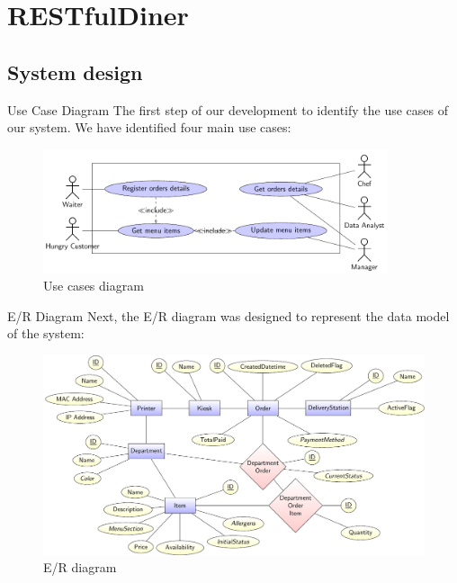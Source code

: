 

\section[RESTfulDiner]{RESTfulDiner}

\subsection[System design]{System design}

\begin{frame}{Use Case Diagram}
	The first step of our development to identify the use cases of our system.
	We have identified four main use cases:

	\begin{figure}[h!]
		\centering
		\includegraphics[width=0.9\textwidth,height=0.55\textheight,keepaspectratio]{images/usecases}
		\caption{Use cases diagram}
		\label{fig:usecases}
	\end{figure}

\end{frame}

\begin{frame}{E/R Diagram}
	Next, the E/R diagram was designed to represent the data model of the
	system:

	\begin{figure}[h!]
		\centering
		\includegraphics[width=\textwidth,height=0.6\textheight,keepaspectratio]{images/er}
		\caption{E/R diagram}
		\label{fig:er}
	\end{figure}

\end{frame}

